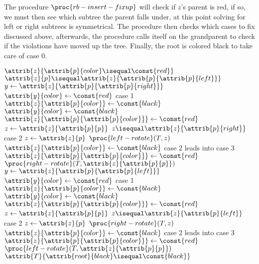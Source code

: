 \documentclass{article}
\begin{document}
The procedure $\proc{rb-insert-fixup}$ will check if $z$'s parent is red, if so, we must then see which subtree the parent falls under, at this point solving for left or right subtrees is symmetrical. The procedure then checks which cases to fix discussed above, afterwards, the procedure calls itself on the grandparent to check if the violations have moved up the tree. Finally, the root is colored black to take care of case 0.

\newpage

\begin{codebox}
\li \While $\attrib{z}{\attrib{p}{color} \isequal \const{red}}$
    \Do
\li     \If $\attrib{z}{p} \isequal \attrib{z}{\attrib{p}{\attrib{p}{left}}}$
\li     \Then
            $y \gets{\attrib{z}{\attrib{p}{\attrib{p}{right}}}}$
\li         \If $\attrib{y}{color} \gets{\const{red}}$ \Comment case 1
\li         \Then
                $\attrib{z}{\attrib{p}{color}} \gets{\const{black}}$
\li             $\attrib{y}{color} \gets{\const{black}}$
\li             $\attrib{z}{\attrib{p}{\attrib{p}{color}}} \gets{\const{red}}$
\li             $z \gets{\attrib{z}{\attrib{p}{p}}}$
\li         \Else
\li             \If $z \isequal \attrib{z}{\attrib{p}{right}}$ \Comment case 2
\li             \Then
                    $z \gets{\attrib{z}{p}}$
\li                 $\proc{left-rotate}(T, z)$
                \End
\li             $\attrib{z}{\attrib{p}{color}}
\gets{\const{black}}$ \Comment case 2 leads into case 3
\li             $\attrib{z}{\attrib{p}{\attrib{p}{color}}} \gets{\const{red}}$
\li             $\proc{right-rotate}(T, \attrib{z}{\attrib{p}{p}})$
            \End
\li     \Else
\li         $y \gets{\attrib{z}{\attrib{p}{\attrib{p}{left}}}}$
\li         \If $\attrib{y}{color} \gets{\const{red}}$ \Comment case 1
\li         \Then
                $\attrib{z}{\attrib{p}{color}} \gets{\const{black}}$
\li             $\attrib{y}{color} \gets{\const{black}}$
\li             $\attrib{z}{\attrib{p}{\attrib{p}{color}}} \gets{\const{red}}$
\li             $z \gets{\attrib{z}{\attrib{p}{p}}}$
\li         \Else
\li             \If $z \isequal \attrib{z}{\attrib{p}{left}}$ \Comment case 2
\li             \Then
                    $z \gets{\attrib{z}{p}}$
\li                 $\proc{right-rotate}(T, z)$
                \End
\li             $\attrib{z}{\attrib{p}{color}} \gets{\const{black}}$ \Comment case 2 leads into case 3
\li             $\attrib{z}{\attrib{p}{\attrib{p}{color}}} \gets{\const{red}}$
\li             $\proc{left-rotate}(T, \attrib{z}{\attrib{p}{p}})$
            \End
        \End
    \End
\li $\attrib{T}{\attrib{root}{black} \isequal \const{black}}$
\end{codebox}
\end{document}
